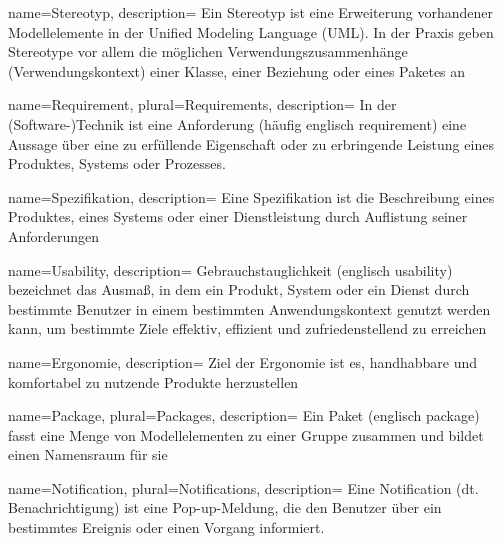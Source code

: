 {
  name=Stereotyp,
  description={
    Ein Stereotyp ist eine Erweiterung vorhandener Modellelemente in der Unified Modeling Language (UML). In der Praxis geben Stereotype vor allem die möglichen Verwendungszusammenhänge (Verwendungskontext) einer Klasse, einer Beziehung oder eines Paketes an}
}

 {
name=Requirement,
plural=Requirements,
description={
In der (Software-)Technik ist eine Anforderung (häufig englisch requirement) eine Aussage über eine zu erfüllende Eigenschaft oder zu erbringende Leistung eines Produktes, Systems oder Prozesses.}
}

{
  name=Spezifikation,
  description={
    Eine Spezifikation ist die Beschreibung eines Produktes, eines Systems oder einer Dienstleistung durch Auflistung seiner Anforderungen}
}

{
name=Usability,
description={
  Gebrauchstauglichkeit (englisch usability) bezeichnet das Ausmaß, in dem ein Produkt, System oder ein Dienst durch bestimmte Benutzer in einem bestimmten Anwendungskontext genutzt werden kann, um bestimmte Ziele effektiv, effizient und zufriedenstellend zu erreichen}
}

 {
name=Ergonomie,
description={
  Ziel der Ergonomie ist es, handhabbare und komfortabel zu nutzende Produkte herzustellen}
}

 {
name=Package,
plural=Packages,
description={
Ein Paket (englisch package) fasst eine Menge von Modellelementen zu einer Gruppe zusammen und bildet einen Namensraum für sie}
}

 {
name=Notification,
plural=Notifications,
description={
Eine Notification (dt. Benachrichtigung) ist eine Pop-up-Meldung, die den Benutzer über ein bestimmtes Ereignis oder einen Vorgang informiert.
}
}
